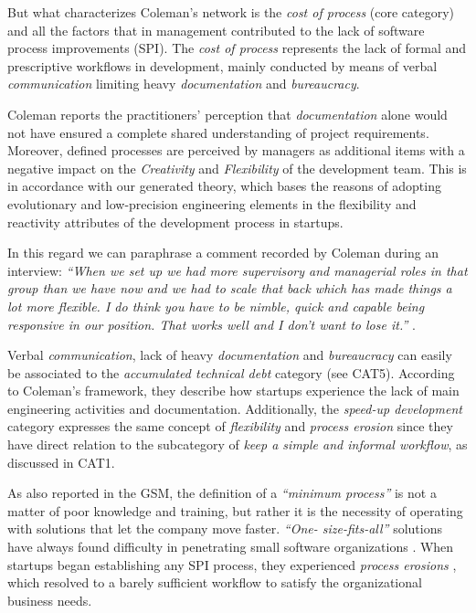 \documentclass[10pt,journal,letterpaper,compsoc]{IEEEtran}
\begin{document}
But what characterizes Coleman's network is the \textit{cost of process} (core
category) and all the factors that in management contributed to the lack of
software process improvements (SPI). The \textit{cost of process} represents the
lack of formal and prescriptive workflows in development, mainly conducted by
means of verbal \textit{communication} limiting heavy \textit{documentation} and
\textit{bureaucracy}.

Coleman reports the practitioners' perception that \textit{documentation} alone
would not have ensured a complete shared understanding of project requirements.
Moreover, defined processes are perceived by managers as additional items with a
negative impact on the \textit{Creativity} and \textit{Flexibility} of the
development team. This is in accordance with our generated theory, which bases
the reasons of adopting evolutionary and low-precision engineering elements in
the flexibility and reactivity attributes of the development process in
startups.

In this regard we can paraphrase a comment recorded by Coleman during an
interview: \textit{``When we set up we had more supervisory and managerial roles
in that group than we have now and we had to scale that back which has made
things a lot more flexible. I do think you have to be nimble, quick and capable
being responsive in our position. That works well and I don't want to lose
it.''} \cite{Coleman2007}.

Verbal \textit{communication}, lack of heavy \textit{documentation} and
\textit{bureaucracy} can easily be associated to the \textit{accumulated
technical debt} category (see CAT5). According to Coleman's framework, they
describe how startups experience the lack of main engineering activities and
documentation. Additionally, the \textit{speed-up development} category
expresses the same concept of \textit{flexibility} and \textit{process erosion}
since they have direct relation to the subcategory of \textit{keep a simple and
informal workflow}, as discussed in CAT1.

As also reported in the GSM, the definition of a \textit{``minimum process''}
is not a matter of poor knowledge and training, but rather it is the necessity
of operating with solutions that let the company move faster.  \textit{``One-
size-fits-all''} solutions have always found difficulty in  penetrating small
software organizations \cite{Staples2007}. When startups began  establishing any
SPI process, they experienced \textit{process erosions}   \cite{Coleman2008}
, which resolved to a barely sufficient workflow to satisfy the organizational  
business needs.
\end{document}
